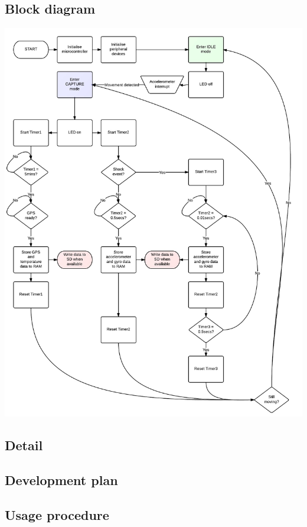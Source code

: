 \documentclass[a4paper, twoside]{article}
\begin{document}
\subsection{Block diagram}
\begin{center}
	\includegraphics[scale=0.35]{images/software.jpeg}
\end{center}

\subsection{Detail} %

\subsection{Development plan}

\subsection{Usage procedure}
\end{document}
